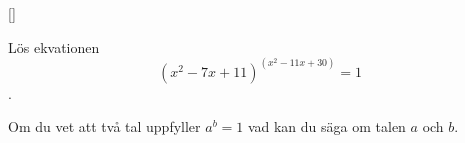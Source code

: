 [\mild]

Lös ekvationen $$(x^2-7x+11)^{(x^2-11x+30)}=1$$.

\begin{rem}
    Om du vet att två tal uppfyller $a^b=1$ vad kan du säga om talen $a$ och $b$.
\end{rem}